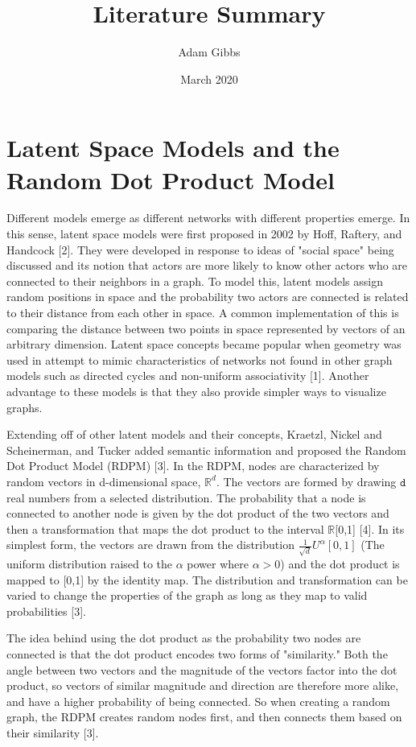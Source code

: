 \documentclass{article}
\title{Literature Summary}
\author{Adam Gibbs}
\date{March 2020}
\begin{document}
\maketitle

\section{Latent Space Models and the Random Dot Product Model}
Different models emerge as different networks with different properties emerge. 
In this sense, latent space models were first proposed in 2002 by Hoff, Raftery, and Handcock [2]. They were developed in response to ideas of "social space" being discussed and its notion that actors are more likely to know other actors who are connected to their neighbors in a graph. To model this, latent models assign random positions in space and the probability two actors are connected is related to their distance from each other in space. A common implementation of this is comparing the distance between two points in space represented by vectors of an arbitrary dimension. Latent space concepts became popular when geometry was used in attempt to mimic characteristics of networks not found in other graph models such as directed cycles and non-uniform associativity [1]. Another advantage to these models is that they also provide simpler ways to visualize graphs.  

Extending off of other latent models and their concepts, Kraetzl, Nickel and Scheinerman, and Tucker added semantic information and proposed the Random Dot Product Model (RDPM) [3]. In the RDPM, nodes are characterized by random vectors in d-dimensional space, $\mathbb{R}^d$. The vectors are formed by drawing $\mathtt{d}$ real numbers from a selected distribution. The probability that a node is connected to another node is given by the dot product of the two vectors and then a transformation that maps the dot product to the interval $\mathbb{R}$[0,1] [4]. In its simplest form, the vectors are drawn from the distribution $\frac{1}{\sqrt{d}} U^\alpha[0,1]$ (The uniform distribution raised to the $\alpha$ power where $\alpha > 0$) and the dot product is mapped to [0,1] by the identity map. The distribution and transformation can be varied to change the properties of the graph as long as they map to valid probabilities [3]. 

The idea behind using the dot product as the probability two nodes are connected is that the dot product encodes two forms of "similarity." Both the angle between two vectors and the magnitude of the vectors factor into the dot product, so vectors of similar magnitude and direction are therefore more alike, and have a higher probability of being connected. So when creating a random graph, the RDPM creates random nodes first, and then connects them based on their similarity [3].
\end{document}
